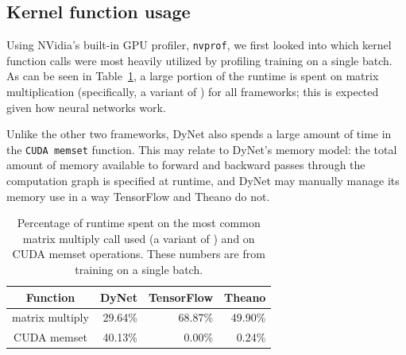 \documentclass{article}
\begin{document}
\subsection{Kernel function usage}
Using NVidia's built-in GPU profiler, \verb!nvprof!, we first looked into which kernel function calls were most heavily utilized by profiling training on a single batch. As can be seen in Table~\ref{tab:pcttime}, a large portion of the runtime is spent on matrix multiplication (specifically, a variant of \texttt{}) for all frameworks; this is expected given how neural networks work.

Unlike the other two frameworks, DyNet also spends a large amount of time in the \texttt{CUDA memset} function. This may relate to DyNet's memory model: the total amount of memory available to forward and backward passes through the computation graph is specified at runtime, and DyNet may manually manage its memory use in a way TensorFlow and Theano do not.

\begin{table}
\centering
\begin{tabular}{c|rrr}
\textbf{Function} & DyNet &  TensorFlow & Theano \\  
\hline
matrix multiply & 29.64\%  &  68.87\% & 49.90\% \\
\hline
CUDA memset & 40.13\% & 0.00\% & 0.24\% \\
\end{tabular}

\caption{\label{tab:pcttime}Percentage of runtime spent on the most common matrix multiply call used (a variant of \texttt{}) and on CUDA memset operations. These numbers are from training on a single batch.}
\end{table}
\end{document}
